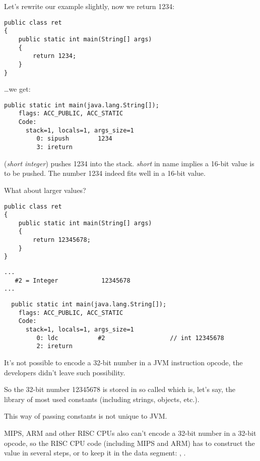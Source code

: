 Let's rewrite our example slightly, now we return 1234:

\begin{lstlisting}[style=customjava]
public class ret
{
	public static int main(String[] args)
	{
		return 1234;
	}
}
\end{lstlisting}

\dots we get:

\begin{lstlisting}[caption=JDK 1.7 (excerpt)]
  public static int main(java.lang.String[]);
    flags: ACC_PUBLIC, ACC_STATIC
    Code:
      stack=1, locals=1, args_size=1
         0: sipush        1234
         3: ireturn
\end{lstlisting}

 (\emph{short integer}) pushes 1234 into the stack.
\emph{short} in name implies a 16-bit value is to be pushed.
The number 1234 indeed fits well in a 16-bit value.

What about larger values?

\begin{lstlisting}[style=customjava]
public class ret
{
	public static int main(String[] args)
	{
		return 12345678;
	}
}
\end{lstlisting}

\begin{lstlisting}[caption=Constant pool]
...
   #2 = Integer            12345678
...
\end{lstlisting}

\begin{lstlisting}
  public static int main(java.lang.String[]);
    flags: ACC_PUBLIC, ACC_STATIC
    Code:
      stack=1, locals=1, args_size=1
         0: ldc           #2                  // int 12345678
         2: ireturn
\end{lstlisting}

It's not possible to encode a 32-bit number in a JVM instruction opcode,
the developers didn't leave such possibility.

So the 32-bit number 12345678 is stored in so called  which is, let's say,
the library of most used constants (including strings, objects, etc.).

This way of passing constants is not unique to JVM.

MIPS, ARM and other RISC CPUs also can't encode a 32-bit number
in a 32-bit opcode, so the RISC CPU code (including MIPS and ARM) has to construct the value
in several steps, or to keep it in the data segment:
, .


